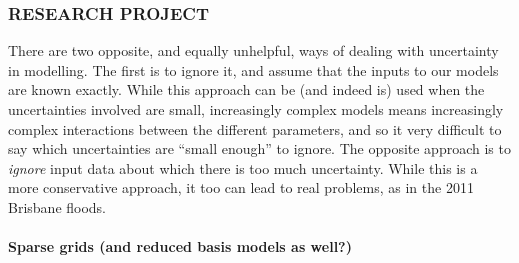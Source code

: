 \documentclass[a4paper,fontsize=12pt]{scrartcl}
\begin{document}
\subsubsection*{RESEARCH PROJECT}

There are two opposite, and equally unhelpful, ways of dealing with
uncertainty in modelling. The first is to ignore it, and assume that
the inputs to our models are known exactly. While this approach can be
(and indeed is) used when the uncertainties involved are small,
increasingly complex models means increasingly complex interactions
between the different parameters, and so it very difficult to say
which uncertainties are ``small enough'' to ignore. The opposite
approach is to \emph{ignore} input data about which there is too much
uncertainty. While this is a more conservative approach, it too can
lead to real problems, as in the 2011 Brisbane floods.

\paragraph{Sparse grids (and reduced basis models as well?)}
\end{document}
